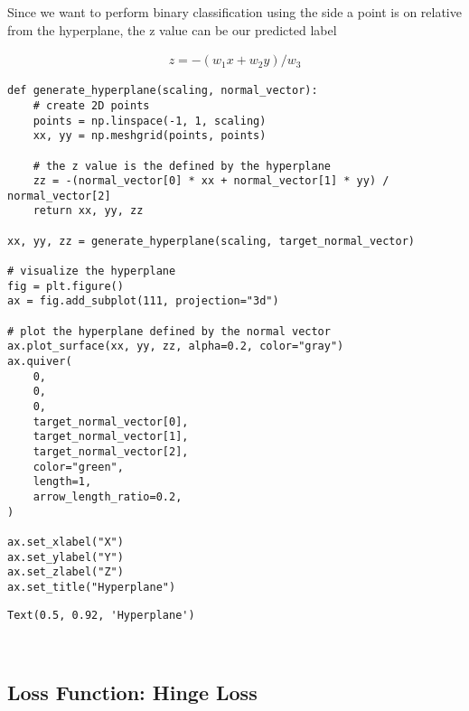\documentclass[openany]{book}
\makeatletter
\newcommand{\boxspacing}{\kern\kvtcb@left@rule\kern\kvtcb@boxsep}
\newcommand{\prompt}[4]{
        {\ttfamily\llap{{\color{#2}[#3]:\hspace{3pt}#4}}\vspace{-\baselineskip}}
    }
\makeatother
\begin{document}
Since we want to perform binary classification using the side a point is
on relative from the hyperplane, the z value can be our predicted label

\begin{align*}
z = -(w_1 x + w_2 y) / w_3
\end{align*}

\begin{tcolorbox}
\tiny
\begin{verbatim}
def generate_hyperplane(scaling, normal_vector):
    # create 2D points
    points = np.linspace(-1, 1, scaling)
    xx, yy = np.meshgrid(points, points)

    # the z value is the defined by the hyperplane
    zz = -(normal_vector[0] * xx + normal_vector[1] * yy) / normal_vector[2]
    return xx, yy, zz

xx, yy, zz = generate_hyperplane(scaling, target_normal_vector)

# visualize the hyperplane
fig = plt.figure()
ax = fig.add_subplot(111, projection="3d")

# plot the hyperplane defined by the normal vector
ax.plot_surface(xx, yy, zz, alpha=0.2, color="gray")
ax.quiver(
    0,
    0,
    0,
    target_normal_vector[0],
    target_normal_vector[1],
    target_normal_vector[2],
    color="green",
    length=1,
    arrow_length_ratio=0.2,
)

ax.set_xlabel("X")
ax.set_ylabel("Y")
ax.set_zlabel("Z")
ax.set_title("Hyperplane")
\end{verbatim}
\end{tcolorbox}

            \begin{tcolorbox}[breakable, size=fbox, boxrule=.5pt, pad at break*=1mm, opacityfill=0]
\prompt{Out}{outcolor}{3}{\boxspacing}
\begin{Verbatim}[commandchars=\\\{\}]
Text(0.5, 0.92, 'Hyperplane')
\end{Verbatim}
\end{tcolorbox}
        
    \begin{center}
    \end{center}
    { \hspace*{\fill} \\}
    
    \subsection{Loss Function: Hinge Loss}\label{loss-function-hinge-loss}
\end{document}
